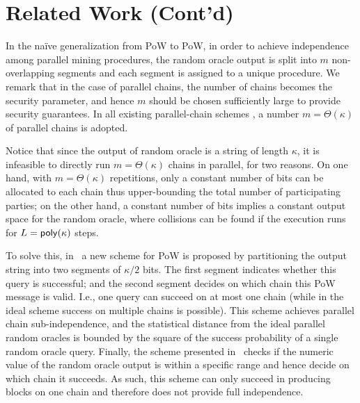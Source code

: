 \section{Related Work (Cont'd)}
\label{sec:related-work-contd}

In the na\"{i}ve generalization from \twoforone PoW to \mforone PoW, in order to achieve independence among parallel mining procedures, the random oracle output is split into $m$ non-overlapping segments and each segment is assigned to a unique procedure.
%
We remark that in the case of parallel chains, the number of chains becomes the security parameter, and hence $m$ should be chosen sufficiently large to provide security guarantees. In all existing parallel-chain schemes \cite{CCS:BKTFV19,TCC:FGKR20}, a number $m = \Theta(\kappa)$ of parallel chains is adopted.

Notice that since the output of random oracle is a string of length $\kappa$, it is infeasible to directly run $m = \Theta(\kappa)$ chains in parallel, for two reasons.
%
On one hand, with $m = \Theta(\kappa)$ repetitions, only a constant number of bits can be allocated to each chain thus upper-bounding the total number of participating parties; on the other hand, a constant number of bits implies a constant output space for the random oracle, where collisions can be found if the execution runs for $L = \mathsf{poly}(\kappa)$ steps.

To solve this, in~\cite{TCC:FGKR20} a new scheme for \mforone PoW is proposed by partitioning the output string into two segments of $\kappa / 2$ bits.
%
The first segment indicates whether this query is successful; and the second segment decides on which chain this PoW message is valid.
%
I.e., one query can succeed on at most one chain (while in the ideal scheme success on multiple chains is possible).
%
This scheme achieves parallel chain sub-independence, and the statistical distance from the ideal parallel random oracles is bounded by the square of the success probability of a single random oracle query.
%
Finally, the \mforone scheme presented in~\cite{CCS:BKTFV19} checks if the numeric value of the random oracle output is within a specific range and hence decide on which chain it succeeds.
%
As such, this scheme can only succeed in producing blocks on one chain and therefore does not provide full independence.
